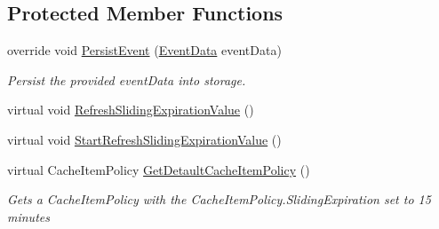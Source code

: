 \subsection*{Protected Member Functions}
\begin{DoxyCompactItemize}
\item 
override void \hyperlink{classCqrs_1_1Events_1_1MemoryCacheEventStore_a9b1a1aaab34770bd68ebcedca0fc40b0_a9b1a1aaab34770bd68ebcedca0fc40b0}{Persist\+Event} (\hyperlink{classCqrs_1_1Events_1_1EventData}{Event\+Data} event\+Data)
\begin{DoxyCompactList}\small\item\em Persist the provided {\itshape event\+Data}  into storage. \end{DoxyCompactList}\item 
virtual void \hyperlink{classCqrs_1_1Events_1_1MemoryCacheEventStore_a4cac39acb87d9e25c4c090a384515d11_a4cac39acb87d9e25c4c090a384515d11}{Refresh\+Sliding\+Expiration\+Value} ()
\item 
virtual void \hyperlink{classCqrs_1_1Events_1_1MemoryCacheEventStore_ac2a6da8b2faac7bd5f333bff592fc8f2_ac2a6da8b2faac7bd5f333bff592fc8f2}{Start\+Refresh\+Sliding\+Expiration\+Value} ()
\item 
virtual Cache\+Item\+Policy \hyperlink{classCqrs_1_1Events_1_1MemoryCacheEventStore_a2dddf1e1c4c737ad393655ee990953b3_a2dddf1e1c4c737ad393655ee990953b3}{Get\+Detault\+Cache\+Item\+Policy} ()
\begin{DoxyCompactList}\small\item\em Get\textquotesingle{}s a Cache\+Item\+Policy with the Cache\+Item\+Policy.\+Sliding\+Expiration set to 15 minutes \end{DoxyCompactList}\end{DoxyCompactItemize}

